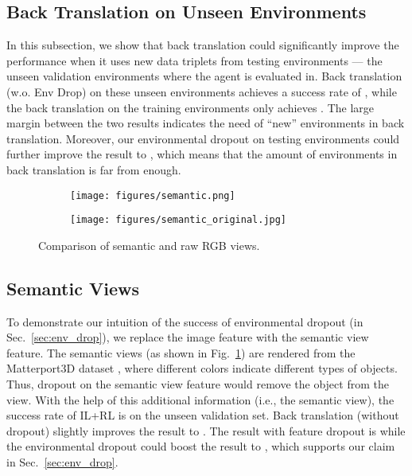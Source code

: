 \documentclass[11pt,a4paper]{article}
\begin{document}
\subsection{Back Translation on Unseen Environments}
\label{sec:sufficient}
In this subsection, we show that back translation could significantly improve the performance when it uses new data triplets from testing environments --- the unseen validation environments where the agent is evaluated in.
Back translation (w.o. Env Drop) on these unseen environments achieves a success rate of , while the back translation on the training environments only achieves .
The large margin between the two results indicates the need of ``new'' environments in back translation.
Moreover, our environmental dropout on testing environments could further improve the result to , which means that the amount of environments in back translation is far from enough.

\begin{figure}[t!]
    \centering
    \begin{subfigure}[t]{0.24\textwidth}
        \centering
        \texttt{[image: figures/semantic.png]}
    \end{subfigure}\begin{subfigure}[t]{0.24\textwidth}
        \centering
        \texttt{[image: figures/semantic\_original.jpg]}
    \end{subfigure}
    \vspace{1pt}
    \caption{Comparison of semantic and raw RGB views.
}
    \label{fig:sem_view}
    \vspace{-6pt}
\end{figure}
\subsection{Semantic Views}
\label{sec:feature_analysis}
To demonstrate our intuition of the success of environmental dropout (in Sec.~\ref{sec:env_drop}), we replace the image feature  with the semantic view feature.
The semantic views (as shown in Fig.~\ref{fig:sem_view}) are rendered from the Matterport3D dataset \cite{Matterport3D}, where different colors indicate different types of objects.
Thus, dropout on the semantic view feature would remove the object from the view.
With the help of this additional information (i.e., the semantic view), the success rate of IL+RL is  on the unseen validation set.
Back translation (without dropout) slightly improves the result to .
The result with feature dropout is  while the environmental dropout could boost the result to , which supports our claim in Sec.~\ref{sec:env_drop}.
 
\end{document}
